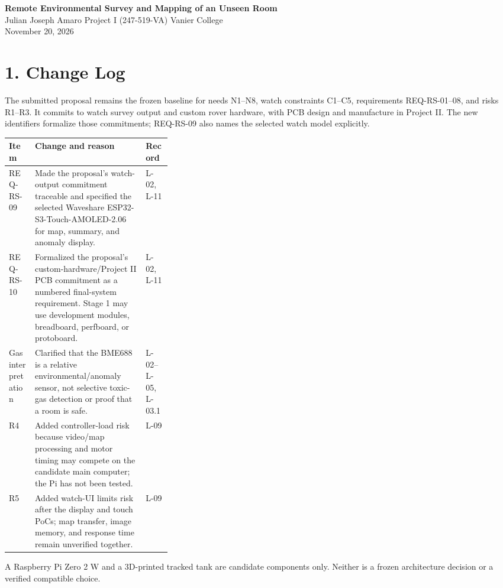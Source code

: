 \documentclass[10pt,letterpaper]{article}
\begin{document}
\small

\begin{center}
{\Large\bfseries Remote Environmental Survey and Mapping of an Unseen Room}\\[4pt]
Julian Joseph Amaro \quad Project I (247-519-VA) \quad Vanier College\\
November 20, 2026
\end{center}

\section*{1. Change Log}

The submitted proposal remains the frozen baseline for needs N1--N8, watch constraints C1--C5, requirements REQ-RS-01--08, and risks R1--R3. It commits to watch survey output and custom rover hardware, with PCB design and manufacture in Project II. The new identifiers formalize those commitments; REQ-RS-09 also names the selected watch model explicitly.

\begin{tabularx}{\linewidth}{>{\raggedright\arraybackslash}p{0.16\linewidth}X>{\raggedright\arraybackslash}p{0.16\linewidth}}
\toprule
\textbf{Item} & \textbf{Change and reason} & \textbf{Record} \\
\midrule
REQ-RS-09 & Made the proposal's watch-output commitment traceable and specified the selected Waveshare ESP32-S3-Touch-AMOLED-2.06 for map, summary, and anomaly display. & L-02, L-11 \\
REQ-RS-10 & Formalized the proposal's custom-hardware/Project II PCB commitment as a numbered final-system requirement. Stage 1 may use development modules, breadboard, perfboard, or protoboard. & L-02, L-11 \\
Gas interpretation & Clarified that the BME688 is a relative environmental/anomaly sensor, not selective toxic-gas detection or proof that a room is safe. & L-02--L-05, L-03.1 \\
R4 & Added controller-load risk because video/map processing and motor timing may compete on the candidate main computer; the Pi has not been tested. & L-09 \\
R5 & Added watch-UI limits risk after the display and touch PoCs; map transfer, image memory, and response time remain unverified together. & L-09 \\
\bottomrule
\end{tabularx}

A Raspberry Pi Zero 2 W and a 3D-printed tracked tank are candidate components only. Neither is a frozen architecture decision or a verified compatible choice.
\end{document}
